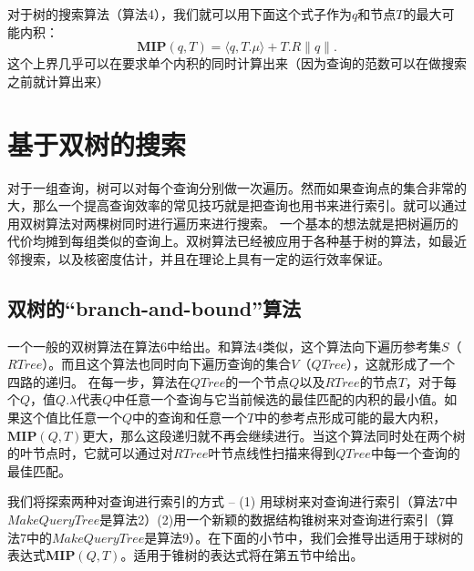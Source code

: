 \documentclass[twocolumn]{article}
\begin{document}
对于树的搜索算法（算法4），我们就可以用下面这个式子作为$q$和节点$T$的最大可能内积：
\begin{equation*}
\mathbf{MIP}(q,T) = \langle q,T.\mu\rangle + T.R\|q\|.
\end{equation*}
这个上界几乎可以在要求单个内积的同时计算出来（因为查询的范数可以在做搜索之前就计算出来）

\section{基于双树的搜索}
对于一组查询，树可以对每个查询分别做一次遍历。然而如果查询点的集合非常的大，那么一个提高查询效率的常见技巧就是把查询也用书来进行索引。就可以通过用双树算法对两棵树同时进行遍历来进行搜索。
一个基本的想法就是把树遍历的代价均摊到每组类似的查询上。双树算法已经被应用于各种基于树的算法，如最近邻搜索，以及核密度估计，并且在理论上具有一定的运行效率保证。

\subsection{双树的“branch-and-bound”算法}
一个一般的双树算法在算法6中给出。和算法4类似，这个算法向下遍历参考集$S$（$RTree$）。而且这个算法也同时向下遍历查询的集合$V$（$QTree$），这就形成了一个四路的递归。
在每一步，算法在$QTree$的一个节点$Q$以及$RTree$的节点$T$，对于每个$Q$，值$Q.\lambda$代表$Q$中任意一个查询与它当前候选的最佳匹配的内积的最小值。如果这个值比任意一个$Q$中的查询和任意一个$T$中的参考点形成可能的最大内积，$\mathbf{MIP}(Q,T)$更大，那么这段递归就不再会继续进行。当这个算法同时处在两个树的叶节点时，它就可以通过对$RTree$叶节点线性扫描来得到$QTree$中每一个查询的最佳匹配。

我们将探索两种对查询进行索引的方式 -- (1) 用球树来对查询进行索引（算法7中$MakeQueryTree$是算法2）(2)用一个新颖的数据结构锥树来对查询进行索引（算法7中的$MakeQueryTree$是算法9）。在下面的小节中，我们会推导出适用于球树的表达式$\mathbf{MIP}(Q,T)$。适用于锥树的表达式将在第五节中给出。
\end{document}
